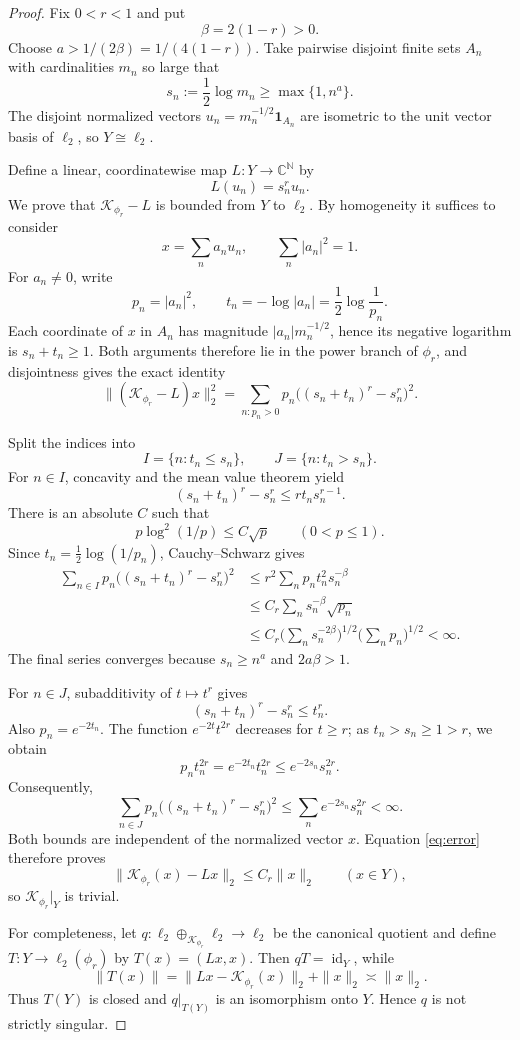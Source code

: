 \documentclass[11pt]{article}
\newcommand{\K}{\mathscr K}
\begin{document}
\begin{proof}
Fix $0<r<1$ and put
\[
 \beta=2(1-r)>0.
\]
Choose $a>1/(2\beta)=1/(4(1-r))$.  Take pairwise disjoint finite sets $A_n$
with cardinalities $m_n$ so large that
\[
 s_n:=\frac12\log m_n\geq\max\{1,n^a\}.
\]
The disjoint normalized vectors $u_n=m_n^{-1/2}\mathbf1_{A_n}$ are isometric
to the unit vector basis of $\ell_2$, so $Y\cong\ell_2$.

Define a linear, coordinatewise map $L:Y\to\mathbb C^{\mathbb N}$ by
\[
 L(u_n)=s_n^r u_n.
\]
We prove that $\K_{\phi_r}-L$ is bounded from $Y$ to $\ell_2$.
By homogeneity it suffices to consider
\[
 x=\sum_n a_nu_n,\qquad \sum_n|a_n|^2=1.
\]
For $a_n\neq0$, write
\[
 p_n=|a_n|^2,\qquad
 t_n=-\log|a_n|=\frac12\log\frac1{p_n}.
\]
Each coordinate of $x$ in $A_n$ has magnitude $|a_n|m_n^{-1/2}$, hence its
negative logarithm is $s_n+t_n\geq1$.  Both arguments therefore lie in the
power branch of $\phi_r$, and disjointness gives the exact identity
\begin{equation}\label{eq:error}
 \|(\K_{\phi_r}-L)x\|_2^2
 =\sum_{n:p_n>0}p_n\big((s_n+t_n)^r-s_n^r\big)^2.
\end{equation}

Split the indices into
\[
 I=\{n:t_n\leq s_n\},\qquad J=\{n:t_n>s_n\}.
\]
For $n\in I$, concavity and the mean value theorem yield
\[
 (s_n+t_n)^r-s_n^r\leq r t_ns_n^{r-1}.
\]
There is an absolute $C$ such that
\[
 p\log^2(1/p)\leq C\sqrt p\qquad(0<p\leq1).
\]
Since $t_n=\frac12\log(1/p_n)$, Cauchy--Schwarz gives
\begin{align*}
 \sum_{n\in I}p_n\big((s_n+t_n)^r-s_n^r\big)^2
 &\leq r^2\sum_n p_nt_n^2s_n^{-\beta}\\
 &\leq C_r\sum_n s_n^{-\beta}\sqrt{p_n}\\
 &\leq C_r\Big(\sum_n s_n^{-2\beta}\Big)^{1/2}
             \Big(\sum_n p_n\Big)^{1/2}<\infty.
\end{align*}
The final series converges because $s_n\geq n^a$ and $2a\beta>1$.

For $n\in J$, subadditivity of $t\mapsto t^r$ gives
\[
 (s_n+t_n)^r-s_n^r\leq t_n^r.
\]
Also $p_n=e^{-2t_n}$.  The function $e^{-2t}t^{2r}$ decreases for $t\geq r$;
as $t_n>s_n\geq1>r$, we obtain
\[
 p_nt_n^{2r}=e^{-2t_n}t_n^{2r}
 \leq e^{-2s_n}s_n^{2r}.
\]
Consequently,
\[
 \sum_{n\in J}p_n\big((s_n+t_n)^r-s_n^r\big)^2
 \leq\sum_n e^{-2s_n}s_n^{2r}<\infty.
\]
Both bounds are independent of the normalized vector $x$.  Equation
\eqref{eq:error} therefore proves
\[
 \|\K_{\phi_r}(x)-Lx\|_2\leq C_r\|x\|_2\qquad(x\in Y),
\]
so $\K_{\phi_r}|_Y$ is trivial.

For completeness, let $q:\ell_2\oplus_{\K_{\phi_r}}\ell_2\to\ell_2$ be the
canonical quotient and define $T:Y\to\ell_2(\phi_r)$ by $T(x)=(Lx,x)$.
Then $qT=\operatorname{id}_Y$, while
\[
 \|T(x)\|=\|Lx-\K_{\phi_r}(x)\|_2+\|x\|_2
 \asymp\|x\|_2.
\]
Thus $T(Y)$ is closed and $q|_{T(Y)}$ is an isomorphism onto $Y$.  Hence $q$
is not strictly singular.
\end{proof}
\end{document}
